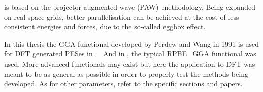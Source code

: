 is based on the projector augmented wave (PAW)~\citemiss methodology.
Being expanded on real space grids, better parallelisation can be achieved at the cost of less consistent energies and forces, due to the so-called eggbox effect.

In this thesis the GGA functional developed by Perdew and Wang in 1991 is used for DFT generated PESes in .~\cite{pw91}
And in , the typical RPBE~\cite{dacapo-1999} GGA functional was used.
More advanced functionals may exist but here the application to DFT was meant to be as general as possible in order to properly test the methods being developed.
As for other parameters, refer to the specific sections and papers.
